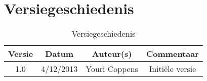 \chapter{Versiegeschiedenis}

\begin{table}[htbp]
	\centering
	\begin{tabular} {|c|c|c|c|}
	    \hline
		\textbf{Versie} & \textbf{Datum} 	& \textbf{Auteur(s)} & \textbf{Commentaar} \\
		\hline
		 1.0	& 4/12/2013	& Youri Coppens & Initi\"{e}le versie\\ \hline
	\end{tabular}
	\caption{Versiegeschiedenis}
\end{table}